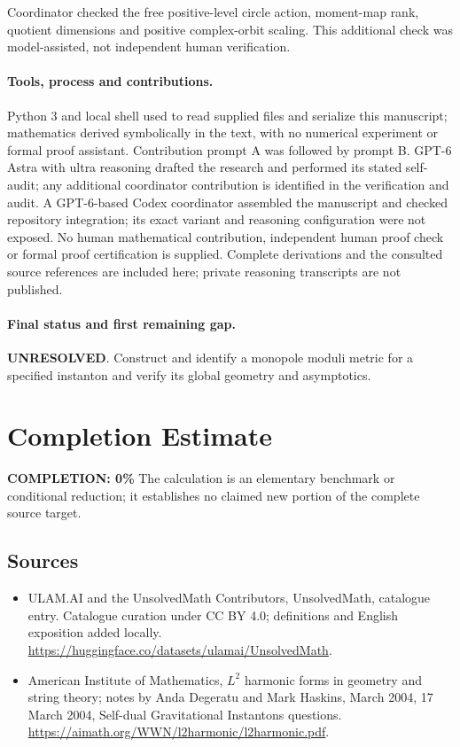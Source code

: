 \documentclass[11pt]{article}
\begin{document}
Coordinator checked the free positive-level circle action, moment-map rank, quotient dimensions and positive complex-orbit scaling. This additional check was model-assisted, not independent human verification.

\paragraph{Tools, process and contributions.}
Python 3 and local shell used to read supplied files and serialize this manuscript; mathematics derived symbolically in the text, with no numerical experiment or formal proof assistant. Contribution prompt A was followed by prompt B. GPT-6 Astra with ultra reasoning drafted the research and performed its stated self-audit; any additional coordinator contribution is identified in the verification and audit. A GPT-6-based Codex coordinator assembled the manuscript and checked repository integration; its exact variant and reasoning configuration were not exposed. No human mathematical contribution, independent human proof check or formal proof certification is supplied. Complete derivations and the consulted source references are included here; private reasoning transcripts are not published.

\paragraph{Final status and first remaining gap.}
\textbf{UNRESOLVED}. Construct and identify a monopole moduli metric for a specified instanton and verify its global geometry and asymptotics.

\section{Completion Estimate}
\noindent\textbf{COMPLETION: 0\%}
The calculation is an elementary benchmark or conditional reduction; it establishes no claimed new portion of the complete source target.

\subsection{Sources}
\begin{itemize}
\item[\hypertarget{source:statement:1}{S1}] ULAM.AI and the UnsolvedMath Contributors, UnsolvedMath, catalogue entry. Catalogue curation under CC BY 4.0; definitions and English exposition added locally.
\url{https://huggingface.co/datasets/ulamai/UnsolvedMath}.
\item[\hypertarget{source:statement:2}{S2}] American Institute of Mathematics, $L^2$ harmonic forms in geometry and string theory; notes by Anda Degeratu and Mark Haskins, March 2004, 17 March 2004, Self-dual Gravitational Instantons questions.
\url{https://aimath.org/WWN/l2harmonic/l2harmonic.pdf}.
\end{itemize}
\label{end:statement}
\end{document}
